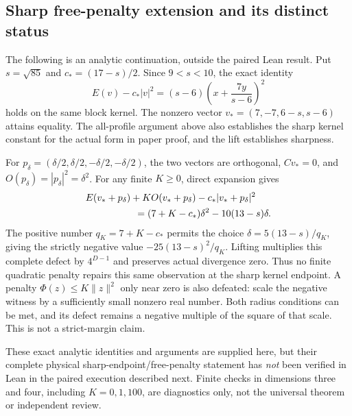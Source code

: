 \subsection{Sharp free-penalty extension and its distinct status}
The following is an analytic continuation, outside the paired Lean result.
Put $s=\sqrt{85}$ and $c_*=(17-s)/2$. Since $9<s<10$, the exact identity
\[
 E(v)-c_*|v|^2=(s-6)\left(x+\frac{7y}{s-6}\right)^2
\]
holds on the same block kernel. The nonzero vector
$v_*=(7,-7,6-s,s-6)$ attains equality. The all-profile argument above
also establishes the sharp kernel constant for the actual form in paper
proof, and the lift establishes sharpness.

For $p_\delta=(\delta/2,\delta/2,-\delta/2,-\delta/2)$, the two vectors
are orthogonal, $Cv_*=0$, and $O(p_\delta)=|p_\delta|^2=\delta^2$.
For any finite $K\geq0$, direct expansion gives
\begin{align*}
 &E(v_*+p_\delta)+K O(v_*+p_\delta)-c_*|v_*+p_\delta|^2\\
 &\hspace{18mm}=(7+K-c_*)\delta^2-10(13-s)\delta.
\end{align*}
The positive number $q_K=7+K-c_*$ permits the choice
$\delta=5(13-s)/q_K$, giving the strictly negative value
$-25(13-s)^2/q_K$. Lifting multiplies this complete defect by
$4^{D-1}$ and preserves actual divergence zero. Thus no finite quadratic
penalty repairs this same observation at the sharp kernel endpoint.
A penalty $\Phi(z)\leq K\|z\|^2$ only near zero is also defeated:
scale the negative witness by a sufficiently small nonzero real number.
Both radius conditions can be met, and its defect remains a negative
multiple of the square of that scale. This is not a strict-margin claim.

These exact analytic identities and arguments are supplied here, but their
complete physical sharp-endpoint/free-penalty statement has \emph{not}
been verified in Lean in the paired execution described next. Finite
checks in dimensions three and four, including $K=0,1,100$, are diagnostics
only, not the universal theorem or independent review.


